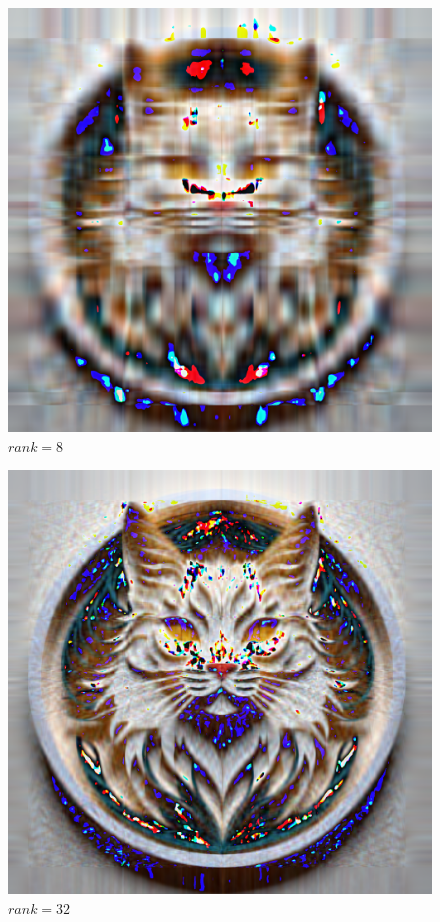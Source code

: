 \begin{figure}
  \includegraphics[width=\linewidth]{../image-compression-color/cat-8.png}
  \caption{$rank=8$}
  \label{fig:cat-bw-rank-8}
\end{figure}

\begin{figure}
  \includegraphics[width=\linewidth]{../image-compression-color/cat-32.png}
  \caption{$rank=32$}
  \label{fig:cat-bw-rank-32}
\end{figure}


